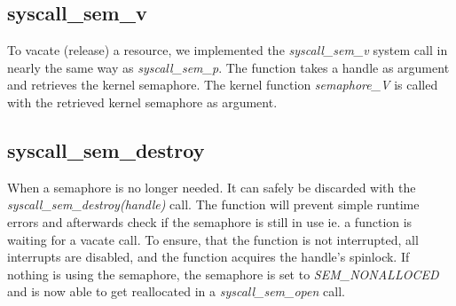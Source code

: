 \documentclass[11pt]{article}
\begin{document}



\subsection{syscall\_sem\_v}
To vacate (release) a resource, we implemented the \emph{syscall\_sem\_v} system call in nearly the same way as \emph{syscall\_sem\_p}. The function takes a handle as argument and retrieves the kernel semaphore. The kernel function \emph{semaphore\_V} is called with the retrieved kernel semaphore as argument.








\subsection{syscall\_sem\_destroy}
When a semaphore is no longer needed. It can safely be discarded with the \emph{syscall\_sem\_destroy(handle)} call. The function will prevent simple runtime errors and afterwards check if the semaphore is still in use ie. a function is waiting for a vacate call. To ensure, that the function is not interrupted, all interrupts are disabled, and the function acquires the handle's spinlock. If nothing is using the semaphore, the semaphore is set to \emph{SEM\_NONALLOCED} and is now able to get reallocated in a \emph{syscall\_sem\_open} call.

\end{document}
